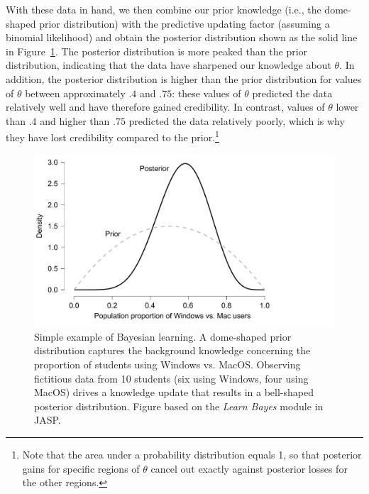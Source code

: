 \documentclass[man]{apa7}
\begin{document}
With these data in hand, we then combine our prior knowledge (i.e., the dome-shaped prior distribution) with the predictive updating factor (assuming a binomial likelihood) and obtain the posterior distribution shown as the solid line in Figure~\ref{fig:WindowsMacPriorPosterior}. The posterior distribution is more peaked than the prior distribution, indicating that the data have sharpened our knowledge about $\theta$. In addition, the posterior distribution is higher than the prior distribution for values of $\theta$ between approximately $.4$ and $.75$: these values of $\theta$ predicted the data relatively well and have therefore gained credibility. In contrast, values of $\theta$ lower than $.4$ and higher than $.75$ predicted the data relatively poorly, which is why they have lost credibility compared to the prior.\footnote{Note that the area under a probability distribution equals 1, so that posterior gains for specific regions of $\theta$ cancel out exactly against posterior losses for the other regions.}  

\begin{figure}[h]
\begin{center}
\includegraphics[width = .785\paperwidth]{WindowsMacPriorPosterior.pdf}
\caption{Simple example of Bayesian learning. A dome-shaped prior distribution captures the background knowledge concerning the proportion of students using Windows vs. MacOS. Observing fictitious data from 10 students (six using Windows, four using MacOS) drives a knowledge update that results in a bell-shaped posterior distribution. Figure based on the \emph{Learn Bayes} module in JASP.}
\label{fig:WindowsMacPriorPosterior}
\end{center}
\end{figure}
\end{document}
